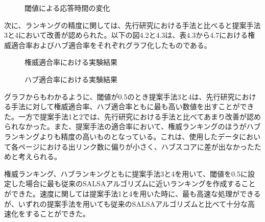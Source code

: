 \documentclass[a4paper,11pt]{jreport}
\begin{document}
\begin{figure}[htbp]
\begin{center}
\end{center}
\caption{閾値による応答時間の変化}
\label{figure:sample}
\end{figure}

\clearpage

次に、ランキングの精度に関しては、先行研究における手法と比べると提案手法3と4において改善が認められた。以下の図4.2と4.3は、表4.3から4.7における権威適合率およびハブ適合率をそれぞれグラフ化したものである。

\begin{figure}[htbp]
\begin{center}
\end{center}
\caption{権威適合率における実験結果}
\label{figure:sample}
\end{figure}

\begin{figure}[htbp]
\begin{center}
\end{center}
\caption{ハブ適合率における実験結果}
\label{figure:sample}
\end{figure}

グラフからもわかるように、閾値が0.5のとき提案手法3と4は、先行研究における手法に対して権威適合率、ハブ適合率ともに最も高い数値を出すことができた。一方で提案手法1と2では、先行研究における手法と比べてあまり改善が認められなかった。また、提案手法の適合率において、権威ランキングのほうがハブランキングよりも精度の高いものとなっている。これは、使用したデータにおいて各ページにおける出リンク数に偏りが小さく、ハブスコアに差が出なかったためと考えられる。

権威ランキング、ハブランキングともに提案手法3と4を用いて、閾値を0.5に設定した場合に最も従来のSALSAアルゴリズムに近いランキングを作成することができた。速度に関しては提案手法1と4を用いた時に、最も高速な処理ができるが、いずれの提案手法を用いても従来のSALSAアルゴリズムと比べて十分な高速化をすることができた。

\clearpage
\end{document}
